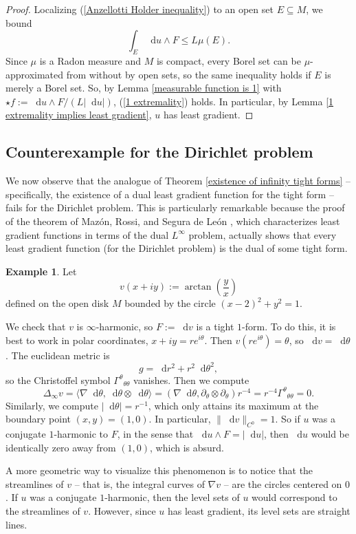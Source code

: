\documentclass[reqno,11pt]{amsart}
\newcommand*\dif{\mathop{}\!\mathrm{d}}
\theoremstyle{definition}
\newtheorem{example}[theorem]{Example}
\numberwithin{equation}{section}
\begin{document}
\begin{proof}
Localizing (\ref{Anzellotti Holder inequality}) to an open set $E \subseteq M$, we bound
$$\int_E \dif u \wedge F \leq L \mu(E).$$
Since $\mu$ is a Radon measure and $M$ is compact, every Borel set can be $\mu$-approximated from without by open sets, so the same inequality holds if $E$ is merely a Borel set.
So, by Lemma \ref{measurable function is 1} with $\star f := \dif u \wedge F/(L|\dif u|)$, (\ref{1 extremality}) holds.
In particular, by Lemma \ref{1 extremality implies least gradient}, $u$ has least gradient.
\end{proof}

\subsection{Counterexample for the Dirichlet problem}
We now observe that the analogue of Theorem \ref{existence of infinity tight forms} -- specifically, the existence of a dual least gradient function for the tight form -- fails for the Dirichlet problem.
This is particularly remarkable because the proof of the theorem of Maz\'on, Rossi, and Segura de Le\'on \cite{Mazon14}, which characterizes least gradient functions in terms of the dual $L^\infty$ problem, actually shows that every least gradient function (for the Dirichlet problem) is the dual of some tight form.

\begin{example}\label{boundaries bad}
Let
$$v(x + iy) := \arctan\left(\frac{y}{x}\right)$$
defined on the open disk $M$ bounded by the circle $(x - 2)^2 + y^2 = 1$.

We check that $v$ is $\infty$-harmonic, so $F := \dif v$ is a tight $1$-form.
To do this, it is best to work in polar coordinates, $x + iy = re^{i\theta}$.
Then $v(re^{i\theta}) = \theta$, so $\dif v = \dif \theta$.
The euclidean metric is 
$$g = \dif r^2 + r^2 \dif \theta^2,$$
so the Christoffel symbol ${\Gamma^\theta}_{\theta \theta}$ vanishes.
Then we compute 
$$\Delta_\infty v = \langle \nabla \dif \theta, \dif \theta \otimes \dif \theta\rangle =  (\nabla \dif \theta, \partial_\theta \otimes \partial_\theta) r^{-4} = r^{-4} {\Gamma^\theta}_{\theta \theta} = 0.$$
Similarly, we compute $|\dif \theta| = r^{-1}$, which only attains its maximum at the boundary point $(x, y) = (1, 0)$.
In particular, $\|\dif v\|_{C^0} = 1$.
So if $u$ was a conjugate $1$-harmonic to $F$, in the sense that $\dif u \wedge F = |\dif u|$, then $\dif u$ would be identically zero away from $(1, 0)$, which is absurd.

A more geometric way to visualize this phenomenon is to notice that the streamlines of $v$ -- that is, the integral curves of $\nabla v$ -- are the circles centered on $0$.
If $u$ was a conjugate $1$-harmonic, then the level sets of $u$ would correspond to the streamlines of $v$.
However, since $u$ has least gradient, its level sets are straight lines.
\end{example}
\end{document}
